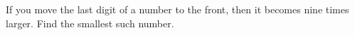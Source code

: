 If you move the last digit of a number to the front, then it becomes nine times larger. Find the smallest such number.
